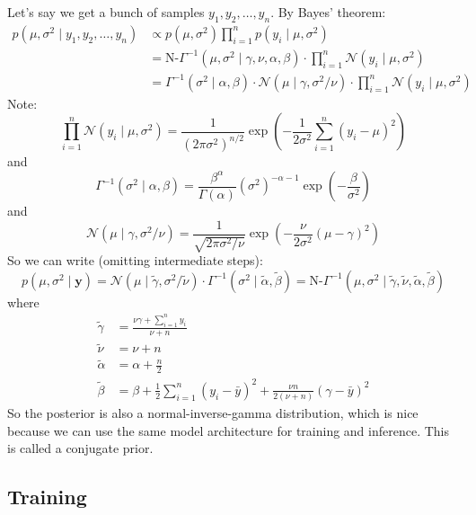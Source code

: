 \documentclass{article}
\renewcommand{\b}{\mathbf}
\newcommand{\f}{\frac}
\newcommand{\0}{\varnothing}
\theoremstyle{definition}
\begin{document}
Let's say we get a bunch of samples $y_1, y_2, \ldots, y_n$. By Bayes' theorem:
\begin{align*}
    p(\mu, \sigma^2 \mid y_1, y_2, \ldots, y_n) &\propto p(\mu, \sigma^2) \prod_{i=1}^n p(y_i \mid \mu, \sigma^2) \\
    &=\text{N-}\Gamma^{-1}(\mu, \sigma^2 \mid \gamma, \nu, \alpha, \beta) \cdot \prod_{i=1}^n \mathcal{N}(y_i \mid \mu, \sigma^2) \\
    &=\Gamma^{-1}(\sigma^2 \mid \alpha, \beta) \cdot \mathcal{N}(\mu \mid \gamma, \sigma^2/\nu) \cdot \prod_{i=1}^n \mathcal{N}(y_i \mid \mu, \sigma^2)
\end{align*}
Note:
$$\prod_{i=1}^n \mathcal{N}(y_i \mid \mu, \sigma^2) = \f{1}{(2\pi\sigma^2)^{n/2}} \exp\left(-\f{1}{2\sigma^2}\sum_{i=1}^n (y_i - \mu)^2\right)$$
and
$$\Gamma^{-1}(\sigma^2 \mid \alpha, \beta) = \f{\beta^\alpha}{\Gamma(\alpha)} (\sigma^2)^{-\alpha - 1} \exp\left(-\f{\beta}{\sigma^2}\right)$$
and
$$\mathcal{N}(\mu \mid \gamma, \sigma^2/\nu) = \f{1}{\sqrt{2\pi\sigma^2/\nu}} \exp\left(-\f{\nu}{2\sigma^2}(\mu - \gamma)^2\right)$$
So we can write (omitting intermediate steps):
$$p(\mu, \sigma^2 \mid \b{y}) = \mathcal{N}(\mu \mid \tilde{\gamma}, \sigma^2 / \tilde{\nu}) \cdot \Gamma^{-1}(\sigma^2 \mid \tilde{\alpha}, \tilde{\beta}) = \text{N-}\Gamma^{-1}(\mu, \sigma^2 \mid \tilde{\gamma}, \tilde{\nu}, \tilde{\alpha}, \tilde{\beta})$$
where
\begin{align*}
    \tilde{\gamma} &= \f{\nu\gamma + \sum_{i=1}^n y_i}{\nu + n} \\
    \tilde{\nu} &= \nu + n \\
    \tilde{\alpha} &= \alpha + \f{n}{2} \\
    \tilde{\beta} &= \beta + \f{1}{2}\sum_{i=1}^n (y_i - \bar{y})^2 + \f{\nu n}{2(\nu + n)}\left(\gamma - \bar{y}\right)^2
\end{align*}
So the posterior is also a normal-inverse-gamma distribution, which is nice because we can use the same model architecture for training and inference. This is called a conjugate prior.

\subsection{Training}
\end{document}
